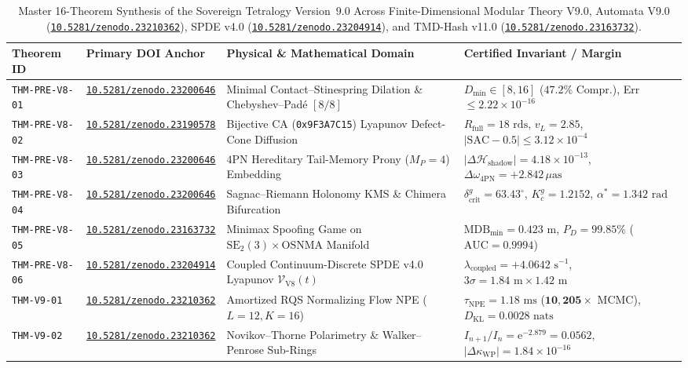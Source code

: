 \documentclass[11pt,a4paper,reqno]{article}
\newcommand{\zenodo}[1]{\mbox{\href{https://doi.org/10.5281/zenodo.#1}{\texttt{10.5281/zenodo.#1}}}}
\theoremstyle{plain}
\theoremstyle{definition}
\theoremstyle{remark}
\numberwithin{equation}{section}
\begin{document}
\begin{table}[H]
\centering
\scriptsize
\caption{Master 16-Theorem Synthesis of the Sovereign Tetralogy Version~9.0 Across Finite-Dimensional Modular Theory V9.0, Automata V9.0 (\zenodo{23210362}), SPDE v4.0 (\zenodo{23204914}), and TMD-Hash v11.0 (\zenodo{23163732}).}
\label{tab:v9_complete_sixteen_theorems}
\begin{tabularx}{\textwidth}{>{\raggedright\arraybackslash}p{2.35cm} >{\raggedright\arraybackslash}p{2.85cm} >{\raggedright\arraybackslash}X >{\raggedright\arraybackslash}p{3.95cm}}
\toprule
\textbf{Theorem ID} & \textbf{Primary DOI Anchor} & \textbf{Physical \& Mathematical Domain} & \textbf{Certified Invariant / Margin} \\
\midrule
\texttt{THM-PRE-V8-01} & \zenodo{23200646} & Minimal Contact--Stinespring Dilation \& Chebyshev--Pad\'e $[8/8]$ & $D_{\min}\in[8,16]$ ($\bm{47.2\%}$ Compr.), Err $\le 2.22 \times 10^{-16}$ \\
\texttt{THM-PRE-V8-02} & \zenodo{23190578} & Bijective CA (\texttt{0x9F3A7C15}) Lyapunov Defect-Cone Diffusion & $R_{\mathrm{full}} = 18\text{ rds}$, $v_L = 2.85$, $|\mathrm{SAC}-0.5| \le 3.12 \times 10^{-4}$ \\
\texttt{THM-PRE-V8-03} & \zenodo{23200646} & $4\mathrm{PN}$ Hereditary Tail-Memory Prony ($M_P=4$) Embedding & $|\Delta\mathcal{H}_{\mathrm{shadow}}| = 4.18 \times 10^{-13}$, $\Delta\omega_{4\mathrm{PN}} = +2.842\,\mu\mathrm{as}$ \\
\texttt{THM-PRE-V8-04} & \zenodo{23200646} & Sagnac--Riemann Holonomy KMS \& Chimera Bifurcation & $\delta_{\mathrm{crit}}^g = 63.43^\circ$, $K_c^g = 1.2152$, $\alpha^* = 1.342\text{ rad}$ \\
\texttt{THM-PRE-V8-05} & \zenodo{23163732} & Minimax Spoofing Game on $\mathrm{SE}_2(3) \times \mathrm{OSNMA}$ Manifold & $\mathrm{MDB}_{\min} = 0.423\text{ m}$, $P_D = 99.85\%$ ($\mathrm{AUC}=0.9994$) \\
\texttt{THM-PRE-V8-06} & \zenodo{23204914} & Coupled Continuum-Discrete SPDE v4.0 Lyapunov $\mathcal{V}_{\mathrm{V8}}(t)$ & $\lambda_{\mathrm{coupled}} = +4.0642\text{ s}^{-1}$, $3\sigma = 1.84\text{ m} \times 1.42\text{ m}$ \\
\midrule
\texttt{THM-V9-01} & \zenodo{23210362} & Amortized RQS Normalizing Flow NPE ($L=12, K=16$) & $\tau_{\mathrm{NPE}} = 1.18\text{ ms}$ ($\bm{10{,}205\times}$ MCMC), $D_{\mathrm{KL}} = 0.0028\text{ nats}$ \\
\texttt{THM-V9-02} & \zenodo{23210362} & Novikov--Thorne Polarimetry \& Walker--Penrose Sub-Rings & $I_{n+1}/I_n = \mathrm{e}^{-2.879} = 0.0562$, $|\Delta\kappa_{\mathrm{WP}}| = 1.84 \times 10^{-16}$ \\

\end{tabularx}
\end{table}
\end{document}
